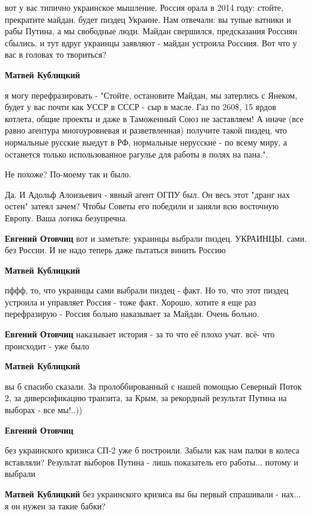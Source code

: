 \begin{itemize}
\begin{itemize}
вот у вас типично украинское мышление. Россия орала в 2014 году: стойте,
прекратите майдан. будет пиздец Украине. Нам отвечали: вы тупые ватники и рабы
Путина, а мы свободные люди. Майдан свершился, предсказания Россиян сбылись. и
тут вдруг украинцы заявляют - майдан устроила Россиия. Вот что у вас в головах
то твориться?

\textbf{Матвей Кублицкий} 

я могу перефразировать - "Стойте, остановите Майдан, мы затерлись с Янеком,
будет у вас почти как УССР в СССР - сыр в масле. Газ по 260\$, 15 ярдов котлета,
общие проекты и даже в Таможенный Союз не заставляем! А иначе (все равно
агентура многоуровневая и разветвленная) получите такой пиздец, что нормальные
русские выедут в РФ, нормальные нерусские - по всему миру, а останется только
использованное рагулье для работы в полях на пана.".

Не похоже? По-моему так и было.


Да. И Адольф Алоизьевич - явный агент ОГПУ был. Он весь этот "дранг нах остен"
затеял зачем? Чтобы Советы его победили и заняли всю восточную Европу. Ваша
логика безупречна.

\textbf{Евгений Отовчиц} вот и заметьте: украинцы выбрали пиздец. УКРАИНЦЫ. сами. без России. И не надо теперь даже пытаться винить Россию

\textbf{Матвей Кублицкий} 

пффф, то, что украинцы сами выбрали пиздец - факт. Но то, что этот пиздец
устроила и управляет Россия - тоже факт. Хорошо, хотите я еще раз перефразирую
- Россия больно наказывает за Майдан. Очень больно.


\textbf{Евгений Отовчиц} наказывает история - за то что её плохо учат. всё- что происходит - уже было

\textbf{Матвей Кублицкий} 

вы б спасибо сказали. За пролоббированный с нашей помощью Северный Поток 2, за
диверсификацию транзита, за Крым, за рекордный результат Путина на выборах -
все мы!..))

\textbf{Евгений Отовчиц} 

без украинского кризиса СП-2 уже б построили. Забыли как нам палки в колеса
вставляли? Результат выборов Путина - лишь показатель его работы... потому и
выбрали

\textbf{Матвей Кублицкий} без украинского кризиса вы бы первый спрашивали - нах... я он нужен за такие бабки?


\end{itemize}
\end{itemize}
